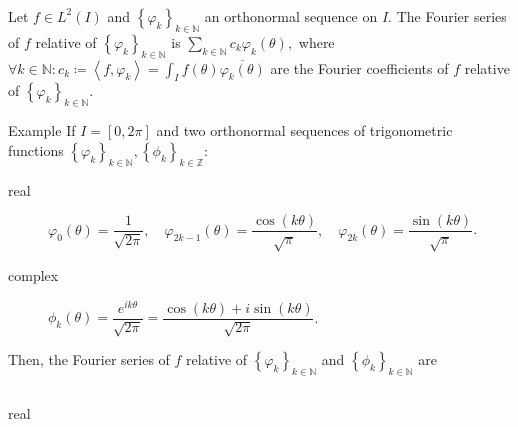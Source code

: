 \begin{frame}
	\frametitle{\secname}
	\begin{definition}
		Let $f\in L^{2}\left(I\right)$ and
		${\left\{\varphi_{k}\right\}}_{k\in\mathds{N}}$ an orthonormal
		sequence on $I$.
		The \alert{Fourier series of $f$ relative} of
		${\left\{\varphi_{k}\right\}}_{k\in\mathds{N}}$ is
		\begin{math}
			\displaystyle
			\sum_{k\in\mathds{N}}
			c_{k}\varphi_{k}\left(\theta\right),
		\end{math}
		where
		\begin{math}
			\forall k\in\mathds{N}:
			c_{k}\coloneqq
			\left\langle f,\varphi_{k}\right\rangle=
			\displaystyle\int_{I}
			f\left(\theta\right)\overline{\varphi_{k}\left(\theta\right)}
		\end{math}
		are the \alert{Fourier coefficients of $f$ relative} of
		${\left\{\varphi_{k}\right\}}_{k\in\mathds{N}}$.
	\end{definition}

	\begin{block}{Example}
		If $I=\left[0,2\pi\right]$ and two
		orthonormal sequences of trigonometric functions
		\begin{math}
			{\left\{\varphi_{k}\right\}}_{k\in\mathds{N}},
			{\left\{\phi_{k}\right\}}_{k\in\mathds{Z}}
		\end{math}:
		\begin{description}
			\item[real]

				\begin{math}
					\varphi_{0}\left(\theta\right)=
					\dfrac{1}{\sqrt{2\pi}},\quad
					\varphi_{2k-1}\left(\theta\right)=
					\dfrac{\cos\left(k\theta\right)}{\sqrt{\pi}},\quad
					\varphi_{2k}\left(\theta\right)=
					\dfrac{\sin\left(k\theta\right)}{\sqrt{\pi}}
				\end{math}.

			\item[complex]

				\begin{math}
					\phi_{k}\left(\theta\right)=
					\dfrac{e^{ik\theta}}{\sqrt{2\pi}}=
					\dfrac{
						\cos\left(k\theta\right)+i\sin\left(k\theta\right)
					}{\sqrt{2\pi}}
				\end{math}.
		\end{description}
		Then, the Fourier series of $f$ relative of
		${\left\{\varphi_{k}\right\}}_{k\in\mathds{N}}$ and
		${\left\{\phi_{k}\right\}}_{k\in\mathds{N}}$ are
		\begin{columns}
			\begin{column}{0.48\textwidth}
				\begin{description}
					\item[real]


\end{description}
\end{column}
\end{columns}
\end{block}
\end{frame}
